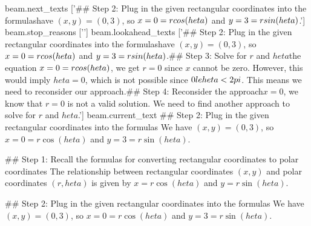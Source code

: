 beam.next_texts
['## Step 2: Plug in the given rectangular coordinates into the formulas\nWe have $(x,y) = (0,3)$, so $x = 0 = r\\cos(heta)$ and $y = 3 = r\\sin(heta)$.\n\n']
beam.stop_reasons
['\n\n']
beam.lookahead_texts
['## Step 2: Plug in the given rectangular coordinates into the formulas\nWe have $(x,y) = (0,3)$, so $x = 0 = r\\cos(heta)$ and $y = 3 = r\\sin(heta)$.\n\n## Step 3: Solve for $r$ and $heta$\nFrom the equation $x = 0 = r\\cos(heta)$, we get $r = 0$ since $x$ cannot be zero. However, this would imply $heta = 0$, which is not possible since $0 \\le heta < 2\\pi$. This means we need to reconsider our approach.\n\n## Step 4: Reconsider the approach\nSince $x = 0$, we know that $r = 0$ is not a valid solution. We need to find another approach to solve for $r$ and $heta$.\n\n']
beam.current_text
## Step 2: Plug in the given rectangular coordinates into the formulas
We have $(x,y) = (0,3)$, so $x = 0 = r\cos(heta)$ and $y = 3 = r\sin(heta)$.


## Step 1: Recall the formulas for converting rectangular coordinates to polar coordinates
The relationship between rectangular coordinates $(x,y)$ and polar coordinates $(r,heta)$ is given by $x = r\cos(heta)$ and $y = r\sin(heta)$.

## Step 2: Plug in the given rectangular coordinates into the formulas
We have $(x,y) = (0,3)$, so $x = 0 = r\cos(heta)$ and $y = 3 = r\sin(heta)$.



